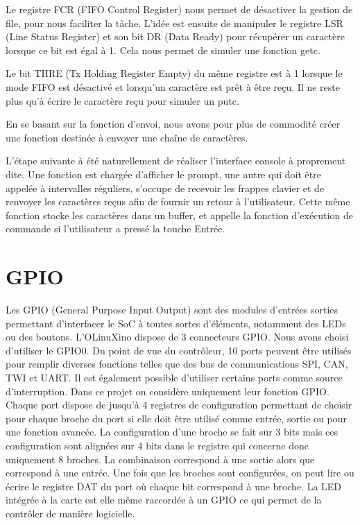 \documentclass[frenchb]{article}
\begin{document}
Le registre FCR (FIFO Control Register) nous permet de désactiver la gestion de file, pour nous faciliter la tâche.
L'idée est ensuite de manipuler le registre LSR (Line Status Register) et son bit DR (Data Ready) pour récupérer un caractère lorsque ce bit est égal à 1. Cela nous permet de simuler une fonction \textsf{getc}.

 Le bit THRE (Tx Holding Register Empty) du même registre est à 1 lorsque le mode FIFO est désactivé et lorsqu'un caractère est prêt à être reçu. Il ne reste plus qu'à écrire le caractère reçu pour simuler un \textsf{putc}.

En se basant sur la fonction d'envoi, nous avons pour plus de commodité créer une fonction destinée à envoyer une chaîne de caractères.

L'étape suivante à été naturellement de réaliser l'interface console à proprement dite. Une fonction est chargée d'afficher le prompt, une autre qui doit être appelée à intervalles réguliers, s'occupe de recevoir les frappes clavier et de renvoyer les caractères reçus afin de fournir un retour à l'utilisateur. Cette même fonction stocke les caractères dans un buffer, et appelle la fonction d'exécution de commande si l'utilisateur a pressé la touche Entrée.

%
\section{GPIO}
Les GPIO (General Purpose Input Output) sont des modules d'entrées sorties permettant d'interfacer le SoC à toutes sortes d'éléments, notamment des LEDs ou des boutons.
L'OLinuXino dispose de 3 connecteurs GPIO. Nous avons choisi d'utiliser le GPIO0. Du point de vue du contrôleur, 10 ports peuvent être utilisés pour remplir diverses fonctions telles que des bus de communications SPI, CAN, TWI et UART. Il est également possible d'utiliser certains ports comme source d'interruption. Dans ce projet on considère uniquement leur fonction GPIO.
Chaque port dispose de jusqu'à 4 registres de configuration permettant de choisir pour chaque broche du port si elle doit être utilisé comme entrée, sortie ou pour une fonction avancée.
La configuration d'une broche se fait sur 3 bits mais ces configuration sont alignées sur 4 bits dans le registre qui concerne donc uniquement 8 broches. La combinaison  correspond à une sortie alors que  correspond à une entrée.
Une fois que les broches sont configurées, on peut lire ou écrire le registre DAT du port où chaque bit correspond à une broche.
La LED intégrée à la carte est elle même raccordée à un GPIO ce qui permet de la contrôler de manière logicielle.
\end{document}
